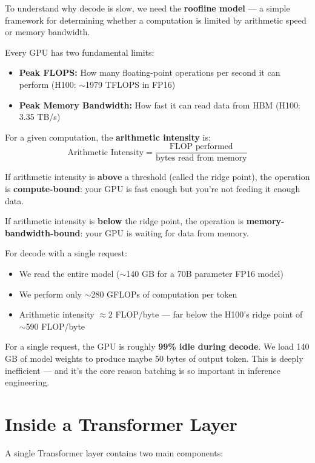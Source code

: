 \documentclass[10pt, oneside, openany]{book}
\newcommand{\warnbox}[2]{\begin{tcolorbox}[warnstyle, title={#1}]#2\end{tcolorbox}}
\newcommand{\keyterm}[1]{\textbf{\color{AccentOrange}#1}}
\begin{document}
To understand why decode is slow, we need the \keyterm{roofline model} --- a
simple framework for determining whether a computation is limited by arithmetic
speed or memory bandwidth.

Every GPU has two fundamental limits:
\begin{itemize}
  \item \textbf{Peak FLOPS:} How many floating-point operations per second it can
        perform (H100: $\sim$1979 TFLOPS in FP16)
  \item \textbf{Peak Memory Bandwidth:} How fast it can read data from HBM
        (H100: 3.35 TB/s)
\end{itemize}

For a given computation, the \textbf{arithmetic intensity} is:
\[
  \text{Arithmetic Intensity} =
  \frac{\text{FLOP performed}}{\text{bytes read from memory}}
\]

If arithmetic intensity is \textbf{above} a threshold (called the ridge point),
the operation is \textbf{compute-bound}: your GPU is fast enough but you're
not feeding it enough data.

If arithmetic intensity is \textbf{below} the ridge point, the operation is
\textbf{memory-bandwidth-bound}: your GPU is waiting for data from memory.

For decode with a single request:
\begin{itemize}
  \item We read the entire model ($\sim$140 GB for a 70B parameter FP16 model)
  \item We perform only $\sim$280 GFLOPs of computation per token
  \item Arithmetic intensity $\approx 2$ FLOP/byte --- far below the H100's
        ridge point of $\sim$590 FLOP/byte
\end{itemize}

\warnbox{The Decode Efficiency Problem}{
For a single request, the GPU is roughly \textbf{99\% idle during decode}.
We load 140 GB of model weights to produce maybe 50 bytes of output token.
This is deeply inefficient --- and it's the core reason batching is so
important in inference engineering.
}

\section{Inside a Transformer Layer}

A single Transformer layer contains two main components:
\end{document}

